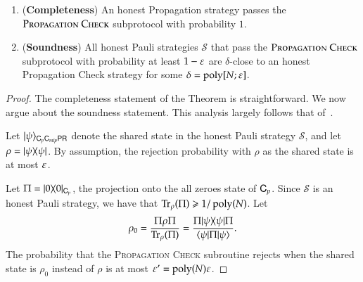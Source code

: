 \begin{lemma}	
\label{lem:prop_check}
\leavevmode
\begin{enumerate}
\item (\textbf{Completeness}) An honest Propagation strategy passes the $\textsc{Propagation Check}$ subprotocol with probability $1$. 
\item (\textbf{Soundness}) All honest Pauli strategies $\mathcal{S}$ that pass the $\textsc{Propagation Check}$ subprotocol with probability at least $1 - \varepsilon$ are $\delta$-close to an honest Propagation Check strategy for some $\delta = \operatorname{poly}[N;\varepsilon]$.
\end{enumerate}
\end{lemma}
\begin{proof}
	The completeness statement of the Theorem is straightforward. We now argue about the soundness statement. This analysis largely follows that of~\cite{ji2016compression}. 
	
	Let $|\psi\rangle_{{\mathsf{C}}_p {\mathsf{C}}_{mip} {\mathsf{P}} {\mathsf{R}}}$ denote the shared state in the honest Pauli strategy $\mathcal{S}$, and let $\rho = |\psi\rangle\! \langle \psi|$. By assumption, the rejection probability with $\rho$ as the shared state is at most $\varepsilon$.
	
	Let $\Pi = |0\rangle\! \langle 0|_{{\mathsf{C}}_p}$, the projection onto the all zeroes state of ${\mathsf{C}}_p$. Since $\mathcal{S}$ is an honest Pauli strategy, we have that $\operatorname{Tr}_\rho (\Pi) \geqslant 1/\operatorname{poly}(N)$. Let 
	\[
		\rho_0 = \frac{\Pi \rho \Pi}{\operatorname{Tr}_\rho(\Pi)} = \frac{\Pi |\psi\rangle\! \langle \psi| \Pi}{\langle\psi| \Pi |\psi\rangle}.
	\]
	The probability that the \textsc{Propagation Check} subroutine rejects when the shared state is $\rho_0$ instead of $\rho$ is at most $\varepsilon' = \operatorname{poly}(N) \varepsilon$. 
	

\end{proof}
